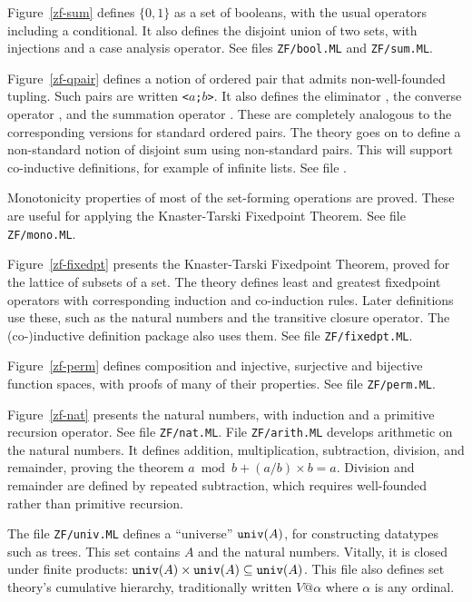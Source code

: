 Figure~\ref{zf-sum} defines $\{0,1\}$ as a set of booleans, with the usual
operators including a conditional.  It also defines the disjoint union of
two sets, with injections and a case analysis operator.  See files
{\tt ZF/bool.ML} and {\tt ZF/sum.ML}.

Figure~\ref{zf-qpair} defines a notion of ordered pair that admits
non-well-founded tupling.  Such pairs are written {\tt<$a$;$b$>}.  It also
defines the eliminator , the converse operator
, and the summation operator .
These are completely analogous to the corresponding versions for standard
ordered pairs.  The theory goes on to define a non-standard notion of
disjoint sum using non-standard pairs.  This will support co-inductive
definitions, for example of infinite lists.  See file .

Monotonicity properties of most of the set-forming operations are proved.
These are useful for applying the Knaster-Tarski Fixedpoint Theorem.
See file {\tt ZF/mono.ML}.

Figure~\ref{zf-fixedpt} presents the Knaster-Tarski Fixedpoint Theorem, proved
for the lattice of subsets of a set.  The theory defines least and greatest
fixedpoint operators with corresponding induction and co-induction rules.
Later definitions use these, such as the natural numbers and
the transitive closure operator.  The (co-)inductive definition
package also uses them.    See file {\tt ZF/fixedpt.ML}.

Figure~\ref{zf-perm} defines composition and injective, surjective and
bijective function spaces, with proofs of many of their properties.
See file {\tt ZF/perm.ML}.

Figure~\ref{zf-nat} presents the natural numbers, with induction and a
primitive recursion operator.  See file {\tt ZF/nat.ML}.  File
{\tt ZF/arith.ML} develops arithmetic on the natural numbers.  It
defines addition, multiplication, subtraction, division, and remainder,
proving the theorem $a \bmod b + (a/b)\times b = a$.  Division and
remainder are defined by repeated subtraction, which requires well-founded
rather than primitive recursion.

The file {\tt ZF/univ.ML} defines a ``universe'' ${\tt univ}(A)$,
for constructing datatypes such as trees.  This set contains $A$ and the
natural numbers.  Vitally, it is closed under finite products: ${\tt
  univ}(A)\times{\tt univ}(A)\subseteq{\tt univ}(A)$.  This file also
defines set theory's cumulative hierarchy, traditionally written $V@\alpha$
where $\alpha$ is any ordinal.

